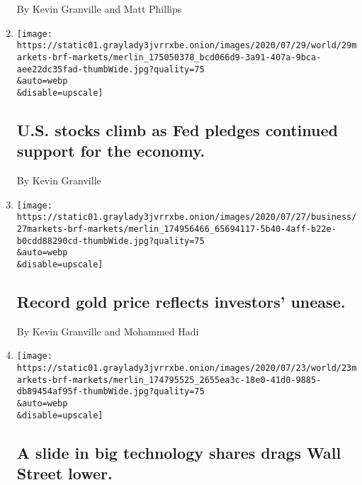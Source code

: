 \begin{enumerate}
  By Kevin Granville and Matt Phillips
\item
  \href{/live/2020/07/29/business/stock-market-today-coronavirus/us-stocks-climb-as-fed-pledges-continued-support-for-the-economy}{}

  \texttt{[image: https://static01.graylady3jvrrxbe.onion/images/2020/07/29/world/29markets-brf-markets/merlin\_175050378\_bcd066d9-3a91-407a-9bca-aee22dc35fad-thumbWide.jpg?quality=75\\\&auto=webp\\\&disable=upscale]}

  \hypertarget{us-stocks-climb-as-fed-pledges-continued-support-for-the-economy}{%
  \subsection{U.S. stocks climb as Fed pledges continued support for the
  economy.}\label{us-stocks-climb-as-fed-pledges-continued-support-for-the-economy}}

  By Kevin Granville
\item
  \href{/live/2020/07/27/business/stock-market-today-coronavirus/record-gold-price-reflects-investors-unease}{}

  \texttt{[image: https://static01.graylady3jvrrxbe.onion/images/2020/07/27/business/27markets-brf-markets/merlin\_174956466\_65694117-5b40-4aff-b22e-b0cdd88290cd-thumbWide.jpg?quality=75\\\&auto=webp\\\&disable=upscale]}

  \hypertarget{record-gold-price-reflects-investors-unease}{%
  \subsection{Record gold price reflects investors'
  unease.}\label{record-gold-price-reflects-investors-unease}}

  By Kevin Granville and Mohammed Hadi
\item
  \href{/live/2020/07/23/business/stock-market-today-coronavirus/a-slide-in-big-technology-shares-drags-wall-street-lower}{}

  \texttt{[image: https://static01.graylady3jvrrxbe.onion/images/2020/07/23/world/23markets-brf-markets/merlin\_174795525\_2655ea3c-18e0-41d0-9885-db89454af95f-thumbWide.jpg?quality=75\\\&auto=webp\\\&disable=upscale]}

  \hypertarget{a-slide-in-big-technology-shares-drags-wall-street-lower}{%
  \subsection{A slide in big technology shares drags Wall Street
  lower.}\label{a-slide-in-big-technology-shares-drags-wall-street-lower}}


\end{enumerate}

